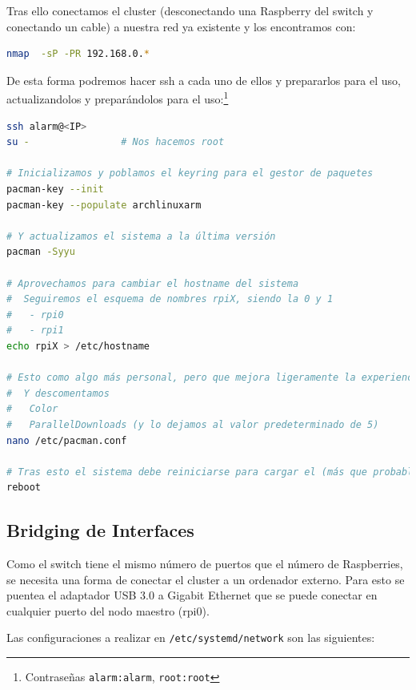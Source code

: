Tras ello conectamos el cluster (desconectando una Raspberry del switch y conectando un cable) a nuestra red ya existente y los encontramos con:

\begin{lstlisting}[language=bash]
nmap  -sP -PR 192.168.0.*    
\end{lstlisting}

De esta forma podremos hacer ssh a cada uno de ellos y prepararlos para el uso, actualizandolos y preparándolos para el uso:\footnote{Contraseñas \texttt{alarm:alarm}, \texttt{root:root}}

\begin{lstlisting}[language=bash]
ssh alarm@<IP>
su -                # Nos hacemos root

# Inicializamos y poblamos el keyring para el gestor de paquetes
pacman-key --init
pacman-key --populate archlinuxarm

# Y actualizamos el sistema a la última versión
pacman -Syyu

# Aprovechamos para cambiar el hostname del sistema
#  Seguiremos el esquema de nombres rpiX, siendo la 0 y 1
#   - rpi0
#   - rpi1
echo rpiX > /etc/hostname

# Esto como algo más personal, pero que mejora ligeramente la experiencia en las actualizaciones, editamos el archivo /etc/pacman.conf
#  Y descomentamos
#   Color
#   ParallelDownloads (y lo dejamos al valor predeterminado de 5)
nano /etc/pacman.conf

# Tras esto el sistema debe reiniciarse para cargar el (más que probable) kernel actualizado
reboot
\end{lstlisting}

\subsection{Bridging de Interfaces}
Como el switch tiene el mismo número de puertos que el número de Raspberries, se necesita una forma de conectar el cluster a un ordenador externo. Para esto se puentea el adaptador USB 3.0 a Gigabit Ethernet que se puede conectar en cualquier puerto del nodo maestro (rpi0).

Las configuraciones a realizar en \texttt{/etc/systemd/network} son las siguientes:

